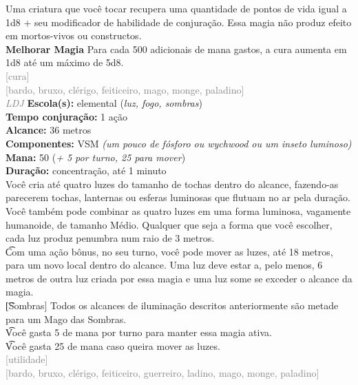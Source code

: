 \documentclass{RPG_Adventure}[2021/10/20]
\begin{document}
{\normalsize Uma criatura que você tocar recupera uma quantidade de pontos de vida igual a 1d8 + seu modificador de habilidade de conjuração. Essa magia não produz efeito em mortos-vivos ou constructos.\\\t \textbf{Melhorar Magia} Para cada 500 adicionais de mana gastos, a cura aumenta em 1d8 até um máximo de 5d8.\\}
{\scriptsize \textcolor{gray}{[cura]\\}}
{\scriptsize \textcolor{gray}{[bardo, bruxo, clérigo, feiticeiro, mago, monge, paladino]\\}}
{\tiny \textcolor{gray}{\textit{LDJ}}}
{\small \t \textbf{Escola(s):} elemental (\textit{luz, fogo, sombras})\\\t \textbf{Tempo conjuração:} 1 ação\\\t \textbf{Alcance:} 36 metros\\\t \textbf{Componentes:} VSM \textit{(um pouco de fósforo ou wychwood ou um inseto luminoso)}\\\t \textbf{Mana:} 50 (\textit{+ 5 por turno, 25 para mover})\\\t \textbf{Duração:} concentração, até 1 minuto\\}
{\normalsize Você cria até quatro luzes do tamanho de tochas dentro do alcance, fazendo-as parecerem tochas, lanternas ou esferas luminosas que flutuam no ar pela duração. Você também pode combinar as quatro luzes em uma forma luminosa, vagamente humanoide, de tamanho Médio. Qualquer que seja a forma que você escolher, cada luz produz penumbra num raio de 3 metros.\\\t Com uma ação bônus, no seu turno, você pode mover as luzes, até 18 metros, para um novo local dentro do alcance. Uma luz deve estar a, pelo menos, 6 metros de outra luz criada por essa magia e uma luz some se exceder o alcance da magia.\\\t [Sombras] Todos os alcances de iluminação descritos anteriormente são metade para um Mago das Sombras.\\\t Você gasta 5 de mana por turno para manter essa magia ativa.\\\t Você gasta 25 de mana caso queira mover as luzes.\\}
{\scriptsize \textcolor{gray}{[utilidade]\\}}
{\scriptsize \textcolor{gray}{[bardo, bruxo, clérigo, feiticeiro, guerreiro, ladino, mago, monge, paladino]\\}}
\end{document}
